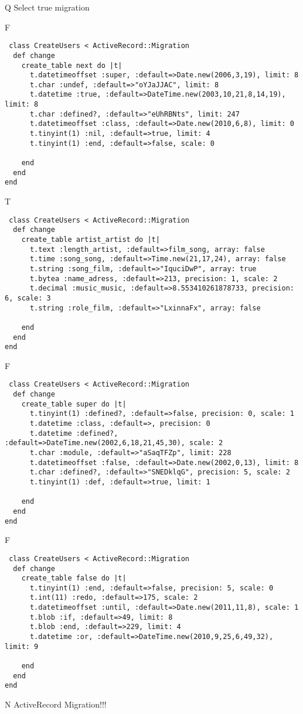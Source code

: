 Q
Select true migration

F
\begin{verbatim}
 class CreateUsers < ActiveRecord::Migration 
  def change 
    create_table next do |t| 
      t.datetimeoffset :super, :default=>Date.new(2006,3,19), limit: 8
      t.char :undef, :default=>"oYJaJJAC", limit: 8
      t.datetime :true, :default=>DateTime.new(2003,10,21,8,14,19), limit: 8
      t.char :defined?, :default=>"eUhRBNts", limit: 247
      t.datetimeoffset :class, :default=>Date.new(2010,6,8), limit: 0
      t.tinyint(1) :nil, :default=>true, limit: 4
      t.tinyint(1) :end, :default=>false, scale: 0
   
    end 
  end 
end
\end{verbatim}

T
\begin{verbatim}
 class CreateUsers < ActiveRecord::Migration 
  def change 
    create_table artist_artist do |t| 
      t.text :length_artist, :default=>film_song, array: false
      t.time :song_song, :default=>Time.new(21,17,24), array: false
      t.string :song_film, :default=>"IquciDwP", array: true
      t.bytea :name_adress, :default=>213, precision: 1, scale: 2
      t.decimal :music_music, :default=>8.553410261878733, precision: 6, scale: 3
      t.string :role_film, :default=>"LxinnaFx", array: false
   
    end 
  end 
end
\end{verbatim}

F
\begin{verbatim}
 class CreateUsers < ActiveRecord::Migration 
  def change 
    create_table super do |t| 
      t.tinyint(1) :defined?, :default=>false, precision: 0, scale: 1
      t.datetime :class, :default=>, precision: 0
      t.datetime :defined?, :default=>DateTime.new(2002,6,18,21,45,30), scale: 2
      t.char :module, :default=>"aSaqTFZp", limit: 228
      t.datetimeoffset :false, :default=>Date.new(2002,0,13), limit: 8
      t.char :defined?, :default=>"SNEDklqG", precision: 5, scale: 2
      t.tinyint(1) :def, :default=>true, limit: 1
   
    end 
  end 
end
\end{verbatim}

F
\begin{verbatim}
 class CreateUsers < ActiveRecord::Migration 
  def change 
    create_table false do |t| 
      t.tinyint(1) :end, :default=>false, precision: 5, scale: 0
      t.int(11) :redo, :default=>175, scale: 2
      t.datetimeoffset :until, :default=>Date.new(2011,11,8), scale: 1
      t.blob :if, :default=>49, limit: 8
      t.blob :end, :default=>229, limit: 4
      t.datetime :or, :default=>DateTime.new(2010,9,25,6,49,32), limit: 9
   
    end 
  end 
end
\end{verbatim}
N
ActiveRecord Migration!!!
  

